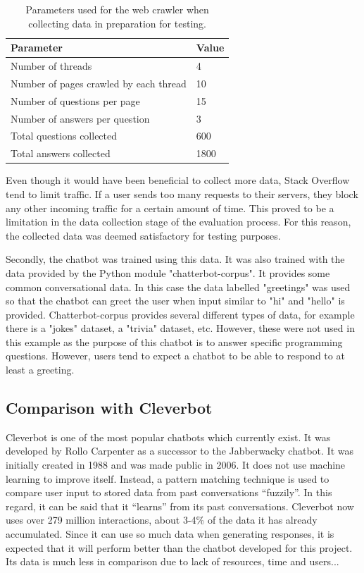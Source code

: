 \documentclass[12pt,a4paper]{article}
\newcommand{\captionstyle}[1] {
    \small{#1}
}
\begin{document}
\begin{table}[!htb]
    \centering
    \renewcommand\arraystretch{1.6}
    \caption{\captionstyle{Parameters used for the web crawler when collecting data in preparation for testing.}}
    \label{tbl:crawlerparams}
    \begin{tabularx}{\textwidth}{XY}
        \toprule
        \textbf{Parameter} & \textbf{Value}  \\
        \midrule
        Number of threads & 4 \\
        Number of pages crawled by each thread & 10 \\
        Number of questions per page & 15\\
        Number of answers per question & 3 \\
        \hline
        Total questions collected & 600 \\
        Total answers collected & 1800 \\
        \bottomrule
    \end{tabularx}
\end{table}%

Even though it would have been beneficial to collect more data, Stack Overflow tend to limit traffic. If a user sends too many requests to their servers, they block any other incoming traffic for a certain amount of time. This proved to be a limitation in the data collection stage of the evaluation process. For this reason, the collected data was deemed satisfactory for testing purposes.

Secondly, the chatbot was trained using this data. It was also trained with the data provided by the Python module "chatterbot-corpus". It provides some common conversational data. In this case the data labelled "greetings" was used so that the chatbot can greet the user when input similar to "hi" and "hello" is provided. Chatterbot-corpus provides several different types of data, for example there is a "jokes" dataset, a "trivia" dataset, etc. However, these were not used in this example as the purpose of this chatbot is to answer specific programming questions. However, users tend to expect a chatbot to be able to respond to at least a greeting.

\subsection{Comparison with Cleverbot}
Cleverbot is one of the most popular chatbots which currently exist. It was developed by Rollo Carpenter as a successor to the Jabberwacky chatbot. It was initially created in 1988 and was made public in 2006. It does not use machine learning to improve itself. Instead, a pattern matching technique is used to compare user input to stored data from past conversations “fuzzily”. In this regard, it can be said that it “learns” from its past conversations. Cleverbot now uses over 279 million interactions, about 3-4\% of the data it has already accumulated. Since it can use so much data when generating responses, it is expected that it will perform better than the chatbot developed for this project. Its data is much less in comparison due to lack of resources, time and users...
\end{document}
